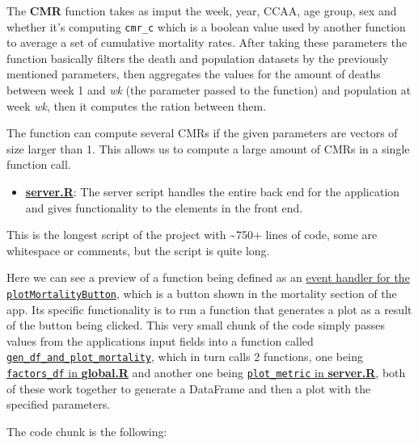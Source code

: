 \documentclass[
  a4paper]{article}
\providecommand{\tightlist}{%
  \setlength{\itemsep}{0pt}\setlength{\parskip}{0pt}}
\begin{document}
\normalsize

The \textbf{CMR} function takes as imput the week, year, CCAA, age
group, sex and whether it's computing \texttt{cmr\_c} which is a boolean
value used by another function to average a set of cumulative mortality
rates. After taking these parameters the function basically filters the
death and population datasets by the previously mentioned parameters,
then aggregates the values for the amount of deaths between week 1 and
\emph{wk} (the parameter passed to the function) and population at week
\emph{wk}, then it computes the ration between them.

The function can compute several CMRs if the given parameters are
vectors of size larger than 1. This allows us to compute a large amount
of CMRs in a single function call.

\begin{itemize}
\tightlist
\item
  \href{https://github.com/dreth/tfm_uc3m/blob/main/dashboard/server.R}{\textbf{server.R}}:
  The server script handles the entire back end for the application and
  gives functionality to the elements in the front end.
\end{itemize}

This is the longest script of the project with \textasciitilde750+ lines
of code, some are whitespace or comments, but the script is quite long.

Here we can see a preview of a function being defined as an
\href{https://github.com/dreth/tfm_uc3m/blob/report_ref/dashboard/server.R\#L252-L264}{event
handler for the \texttt{plotMortalityButton}}, which is a button shown
in the mortality section of the app. Its specific functionality is to
run a function that generates a plot as a result of the button being
clicked. This very small chunk of the code simply passes values from the
applications input fields into a function called
\href{https://github.com/dreth/tfm_uc3m/blob/report_ref/dashboard/server.R\#L114-L131}{\texttt{gen\_df\_and\_plot\_mortality}},
which in turn calls 2 functions, one being
\href{https://github.com/dreth/tfm_uc3m/blob/report_ref/dashboard/global.R\#L269-L336}{\texttt{factors\_df}
in \textbf{global.R}} and another one being
\href{https://github.com/dreth/tfm_uc3m/blob/report_ref/dashboard/server.R\#L18-L111}{\texttt{plot\_metric}
in \textbf{server.R}}, both of these work together to generate a
DataFrame and then a plot with the specified parameters.

The code chunk is the following:
\end{document}
